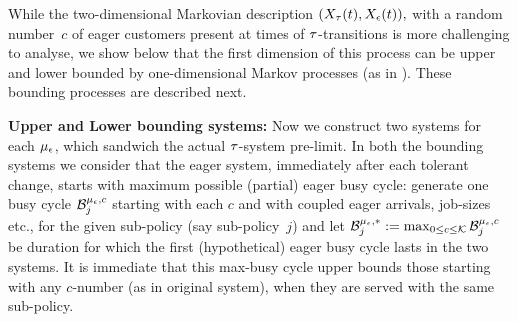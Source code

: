 {While the two-dimensional Markovian description
$(X_\tau (t), X_{ \epsilon } (t)),$ with a random number~$c$ of eager customers
present at times of ${\tau}$-transitions is more challenging to analyse,
we show below that the first dimension of this process can be upper
and lower bounded by one-dimensional Markov processes (as in
\cite{ANOR}). These bounding processes are described next.



{\bf Upper and Lower bounding systems:} Now we construct two systems
for each ${\mu_\epsilon}$, which sandwich the actual ${\tau}$-system pre-limit. In
both the bounding systems we consider that the eager system,
immediately after each tolerant change, starts with maximum possible
(partial) eager busy cycle: generate one busy cycle $\mathcal{B}_{j}^{{\mu_\epsilon}, c}$
starting with each $c$ and with coupled eager arrivals, job-sizes
etc., for the given sub-policy (say sub-policy~$j$) and let
$\mathcal{B}_{j}^{{\mu_\epsilon}, *}:= \max_{0 \le c \le {\cal K}} \mathcal{B}_{j}^{{\mu_\epsilon}, c}$ be
duration for which the first (hypothetical) eager busy cycle lasts in
the two systems. It is immediate that this max-busy cycle upper bounds
those starting with any $c$-number (as in original system), when they
are served with the same sub-policy.

}

